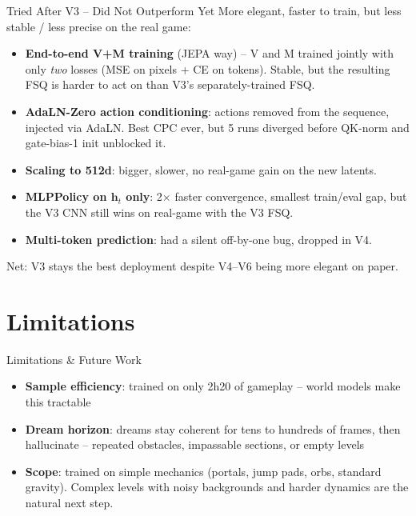 \documentclass[aspectratio=169]{beamer}
\begin{document}
\begin{frame}{Tried After V3 -- Did Not Outperform Yet}
  \vspace{0.3em}
  More elegant, faster to train, but less stable / less precise on the real game:

  \vspace{0.5em}
  \begin{itemize}
    \item \textbf{End-to-end V+M training} (JEPA way) -- V and M trained jointly with only \emph{two} losses (MSE on pixels + CE on tokens). Stable, but the resulting FSQ is harder to act on than V3's separately-trained FSQ.
    \item \textbf{AdaLN-Zero action conditioning}: actions removed from the sequence, injected via AdaLN. Best CPC ever, but 5 runs diverged before QK-norm and gate-bias-1 init unblocked it.
    \item \textbf{Scaling to 512d}: bigger, slower, no real-game gain on the new latents.
    \item \textbf{MLPPolicy on $\mathbf{h}_t$ only}: 2$\times$ faster convergence, smallest train/eval gap, but the V3 CNN still wins on real-game with the V3 FSQ.
    \item \textbf{Multi-token prediction}: had a silent off-by-one bug, dropped in V4.
  \end{itemize}

  \vspace{0.3em}
  \begin{center}
    \small
    Net: V3 stays the best deployment despite V4--V6 being more elegant on paper.
  \end{center}
\end{frame}

\section{Limitations}

\begin{frame}{Limitations \& Future Work}
  \begin{itemize}
    \item \textbf{Sample efficiency}: trained on only 2h20 of gameplay -- world models make this tractable
    \item \textbf{Dream horizon}: dreams stay coherent for tens to hundreds of frames, then hallucinate -- repeated obstacles, impassable sections, or empty levels
    \item \textbf{Scope}: trained on simple mechanics (portals, jump pads, orbs, standard gravity). Complex levels with noisy backgrounds and harder dynamics are the natural next step.
  \end{itemize}
\end{frame}
\end{document}
